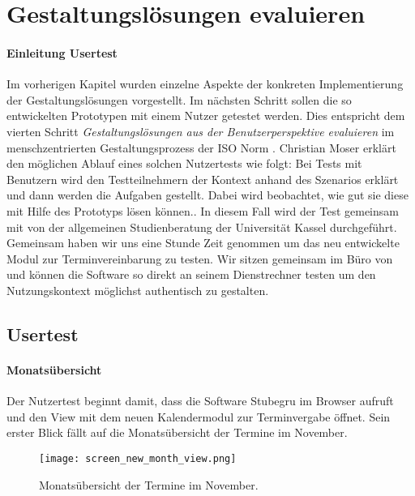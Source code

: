 \chapter{Gestaltungslösungen evaluieren}


\subsubsection{Einleitung Usertest}
Im vorherigen Kapitel wurden einzelne Aspekte der konkreten Implementierung der
Gestaltungslösungen vorgestellt. Im nächsten Schritt sollen die so entwickelten
Prototypen mit einem Nutzer getestet werden. Dies entspricht dem vierten
Schritt \textit{Gestaltungslösungen aus der Benutzerperspektive evaluieren} im
menschzentrierten Gestaltungsprozess der ISO Norm \cite{iso9241}. Christian
Moser erklärt den möglichen Ablauf eines solchen Nutzertests wie folgt:
\glqq{}Bei Tests mit Benutzern wird den Testteilnehmern der Kontext anhand des
Szenarios erklärt und dann werden die Aufgaben gestellt. Dabei wird beobachtet,
wie gut sie diese mit Hilfe des Prototyps lösen können.\grqq{}\cite{moserTesting}. In diesem Fall wird der Test gemeinsam mit \ipName von der allgemeinen Studienberatung der Universität Kassel durchgeführt. Gemeinsam haben wir uns eine Stunde Zeit genommen um das neu entwickelte Modul zur Terminvereinbarung zu testen. Wir sitzen gemeinsam im Büro von \ipName und können die Software so direkt an seinem Dienstrechner testen um den Nutzungskontext möglichst authentisch zu gestalten.

\section{Usertest}
\subsubsection{Monatsübersicht}
Der Nutzertest beginnt damit, dass \ipName die Software Stubegru im Browser
aufruft und den View mit dem neuen Kalendermodul zur Terminvergabe öffnet. Sein
erster Blick fällt auf die Monatsübersicht der Termine im November.

\begin{figure}[H]
    \caption{Monatsübersicht der Termine im November.}
    \centering
    \texttt{[image: screen\_new\_month\_view.png]}
\end{figure}

